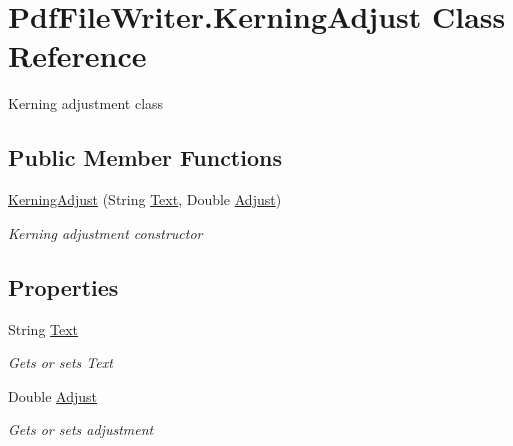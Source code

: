 \hypertarget{class_pdf_file_writer_1_1_kerning_adjust}{}\section{Pdf\+File\+Writer.\+Kerning\+Adjust Class Reference}
\label{class_pdf_file_writer_1_1_kerning_adjust}


Kerning adjustment class  


\subsection*{Public Member Functions}
\begin{DoxyCompactItemize}
\item 
\hyperlink{class_pdf_file_writer_1_1_kerning_adjust_a03729534e4d058b2d5b3f0751725b391}{Kerning\+Adjust} (String \hyperlink{class_pdf_file_writer_1_1_kerning_adjust_aea25b0c5624eb36bfff5d0a5f784e91f}{Text}, Double \hyperlink{class_pdf_file_writer_1_1_kerning_adjust_acbd920eadb1b965fc7cd18b943b890fc}{Adjust})
\begin{DoxyCompactList}\small\item\em Kerning adjustment constructor \end{DoxyCompactList}\end{DoxyCompactItemize}
\subsection*{Properties}
\begin{DoxyCompactItemize}
\item 
String \hyperlink{class_pdf_file_writer_1_1_kerning_adjust_aea25b0c5624eb36bfff5d0a5f784e91f}{Text}
\begin{DoxyCompactList}\small\item\em Gets or sets Text \end{DoxyCompactList}\item 
Double \hyperlink{class_pdf_file_writer_1_1_kerning_adjust_acbd920eadb1b965fc7cd18b943b890fc}{Adjust}
\begin{DoxyCompactList}\small\item\em Gets or sets adjustment \end{DoxyCompactList}\end{DoxyCompactItemize}


